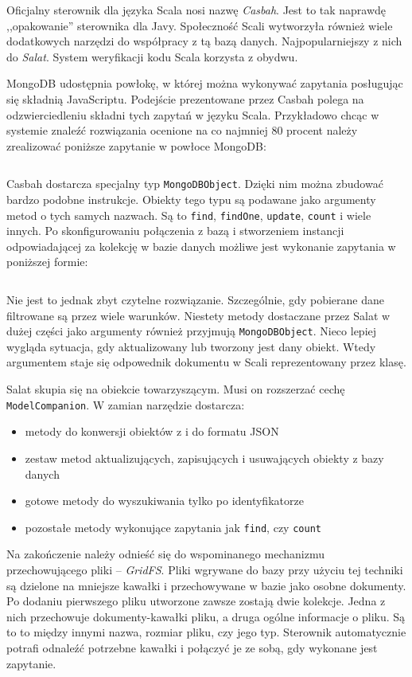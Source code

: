 \documentclass[brudnopis]{xmgr}
\begin{document}
Oficjalny sterownik dla języka Scala nosi nazwę \emph{Casbah}. Jest to tak naprawdę ,,opakowanie'' sterownika dla Javy. Społeczność Scali wytworzyła również wiele dodatkowych narzędzi do współpracy z tą bazą danych. Najpopularniejszy z nich do \emph{Salat}. System weryfikacji kodu Scala korzysta z obydwu.

MongoDB udostępnia powłokę, w której można wykonywać zapytania posługując się składnią JavaScriptu. Podejście prezentowane przez Casbah polega na odzwierciedleniu składni tych zapytań w języku Scala.  
Przykładowo chcąc w systemie znaleźć rozwiązania ocenione na co najmniej 80 procent należy zrealizować poniższe zapytanie w powłoce MongoDB:

\inputminted[fontsize=\small]{javascript}{code/mongoFind.js}

Casbah dostarcza specjalny typ \texttt{MongoDBObject}. Dzięki nim można zbudować bardzo podobne instrukcje. Obiekty tego typu są podawane jako argumenty metod o tych samych nazwach. Są to \texttt{find}, \texttt{findOne}, \texttt{update}, \texttt{count} i wiele innych. Po skonfigurowaniu połączenia z bazą i stworzeniem instancji odpowiadającej za kolekcję w bazie danych możliwe jest wykonanie zapytania w poniższej formie:

\inputminted[fontsize=\small]{scala}{code/casbahFind.scala} 

Nie jest to jednak zbyt czytelne rozwiązanie. Szczególnie, gdy pobierane dane filtrowane są przez wiele warunków. Niestety metody dostaczane przez Salat w dużej części jako argumenty również przyjmują \texttt{MongoDBObject}. Nieco lepiej wygląda sytuacja, gdy aktualizowany lub tworzony jest dany obiekt. Wtedy argumentem staje się odpowednik dokumentu w Scali reprezentowany przez klasę.

Salat skupia się na obiekcie towarzyszącym. Musi on rozszerzać cechę \texttt{ModelCompanion}. W zamian narzędzie dostarcza:

\begin{itemize}
\item metody do konwersji obiektów z i do formatu JSON
\item zestaw metod aktualizujących, zapisujących i usuwających obiekty z bazy danych
\item gotowe metody do wyszukiwania tylko po identyfikatorze
\item pozostałe metody wykonujące zapytania jak \texttt{find}, czy \texttt{count}
\end{itemize}

Na zakończenie należy odnieść się do wspominanego mechanizmu przechowującego pliki -- \emph{GridFS}. Pliki wgrywane do bazy przy użyciu tej techniki są dzielone na mniejsze kawałki i przechowywane w bazie jako osobne dokumenty. Po dodaniu pierwszego pliku utworzone zawsze zostają dwie kolekcje. Jedna z nich przechowuje dokumenty-kawałki pliku, a druga ogólne informacje o pliku. Są to to między innymi nazwa, rozmiar pliku, czy jego typ. Sterownik automatycznie potrafi odnaleźć potrzebne kawałki i połączyć je ze sobą, gdy wykonane jest zapytanie. 
\end{document}
